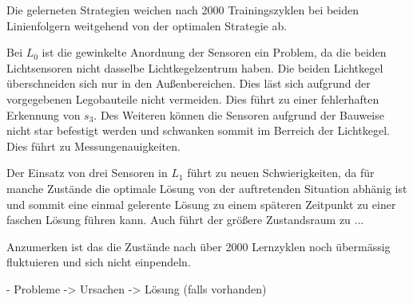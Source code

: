 Die gelerneten Strategien weichen nach 2000 Trainingszyklen bei beiden Linienfolgern weitgehend von der optimalen Strategie ab. \par
Bei $L_0$ ist die gewinkelte Anordnung der Sensoren ein Problem, da die beiden Lichtsensoren nicht dasselbe Lichtkegelzentrum haben. Die beiden Lichtkegel überschneiden sich nur in den Außenbereichen. Dies läst sich aufgrund der vorgegebenen Legobauteile nicht vermeiden. Dies führt zu einer fehlerhaften Erkennung von $s_3$. Des Weiteren können die Sensoren aufgrund der Bauweise nicht star befestigt werden und schwanken sommit im Berreich der Lichtkegel. Dies führt zu Messungenauigkeiten. \par
Der Einsatz von drei Sensoren in $L_1$ führt zu neuen Schwierigkeiten, da für manche Zustände die optimale Lösung von der auftretenden Situation abhänig ist und sommit eine einmal gelerente Lösung zu einem späteren Zeitpunkt zu einer faschen Lösung führen kann. Auch führt der größere Zustandsraum zu ... \par
Anzumerken ist das die Zustände nach über 2000 Lernzyklen noch übermässig fluktuieren und sich nicht einpendeln.

- Probleme -> Ursachen -> Lösung (falls vorhanden)  

